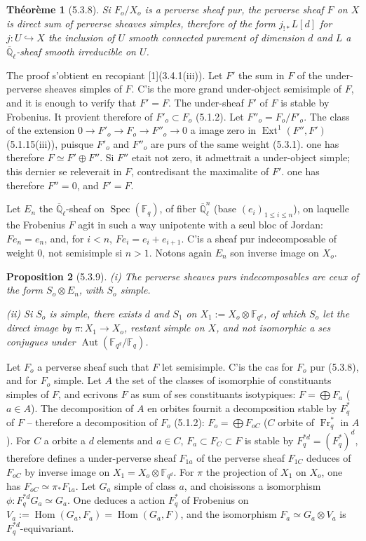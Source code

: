 \documentclass[12pt,a4paper]{article}
\theoremstyle{plain}
\newtheorem{theorem}{Th\'eor\`eme}[section]
\newtheorem{proposition}[theorem]{Proposition}
\theoremstyle{definition}
\theoremstyle{remark}
\DeclareMathOperator{\Hom}{Hom}
\DeclareMathOperator{\Ext}{Ext}
\DeclareMathOperator{\Aut}{Aut}
\DeclareMathOperator{\Spec}{Spec}
\DeclareMathOperator{\Fr}{Fr}
\newcommand{\FF}{\mathbb{F}}
\newcommand{\QQ}{\mathbb{Q}}
\begin{document}
\begin{theorem}[5.3.8]
Si $F_o/X_o$ is a perverse sheaf pur, the perverse sheaf $F$ on $X$ is direct sum of perverse sheaves simples, therefore of the form $j_{!*}L[d]$ for $j: U \hookrightarrow X$ the inclusion of $U$ smooth connected purement of dimension $d$ and $L$ a $\overline{\QQ}_{\ell}$-sheaf smooth irreducible on $U$.
\end{theorem}

The proof s'obtient en recopiant [1](3.4.1(iii)). Let $F'$ the sum in $F$ of the under-perverse sheaves simples of $F$. C'is the more grand under-object semisimple of $F$, and it is enough to verify that $F' = F$. The under-sheaf $F'$ of $F$ is stable by Frobenius. It provient therefore of $F'_o \subset F_o$ (5.1.2). Let $F''_o = F_o/F'_o$. The class of the extension $0 \to F'_o \to F_o \to F''_o \to 0$ a image zero in $\Ext^1(F'', F')$ (5.1.15(iii)), puisque $F'_o$ and $F''_o$ are purs of the same weight (5.3.1). one has therefore $F \simeq F' \oplus F''$. Si $F''$ etait not zero, it admettrait a under-object simple; this dernier se releverait in $F$, contredisant the maximalite of $F'$. one has therefore $F'' = 0$, and $F' = F$.

Let $E_n$ the $\overline{\QQ}_{\ell}$-sheaf on $\Spec(\FF_q)$, of fiber $\overline{\QQ}_{\ell}^n$ (base $(e_i)_{1 \leq i \leq n}$), on laquelle the Frobenius $F$ agit in such a way unipotente with a seul bloc of Jordan: $Fe_n = e_n$, and, for $i < n$, $Fe_i = e_i + e_{i+1}$. C'is a sheaf pur indecomposable of weight $0$, not semisimple si $n > 1$. Notons again $E_n$ son inverse image on $X_o$.

\begin{proposition}[5.3.9]
(i) The perverse sheaves purs indecomposables are ceux of the form $S_o \otimes E_n$, with $S_o$ simple.

(ii) Si $S_o$ is simple, there exists $d$ and $S_1$ on $X_1 := X_o \otimes \FF_{q^d}$, of which $S_o$ let the direct image by $\pi: X_1 \to X_o$, restant simple on $X$, and not isomorphic a ses conjugues under $\Aut(\FF_{q^d}/\FF_q)$.
\end{proposition}

Let $F_o$ a perverse sheaf such that $F$ let semisimple. C'is the cas for $F_o$ pur (5.3.8), and for $F_o$ simple. Let $A$ the set of the classes of isomorphie of constituants simples of $F$, and ecrivons $F$ as sum of ses constituants isotypiques: $F = \bigoplus F_a$ ($a \in A$). The decomposition of $A$ en orbites fournit a decomposition stable by $F^*_q$ of $F$ -- therefore a decomposition of $F_o$ (5.1.2): $F_o = \bigoplus F_{oC}$ ($C$ orbite of $\Fr_q^*$ in $A$). For $C$ a orbite a $d$ elements and $a \in C$, $F_a \subset F_C \subset F$ is stable by $F^{*d}_q = (F^*_q)^d$, therefore defines a under-perverse sheaf $F_{1a}$ of the perverse sheaf $F_{1C}$ deduces of $F_{oC}$ by inverse image on $X_1 = X_o \otimes \FF_{q^d}$. For $\pi$ the projection of $X_1$ on $X_o$, one has $F_{oC} \simeq \pi_*F_{1a}$. Let $G_a$ simple of class $a$, and choisissons a isomorphism $\phi: F^{*d}_q G_a \simeq G_a$. One deduces a action $F^*_q$ of Frobenius on $V_a := \Hom(G_a, F_a) = \Hom(G_a, F)$, and the isomorphism $F_a \simeq G_a \otimes V_a$ is $F^{*d}_q$-equivariant.
\end{document}
